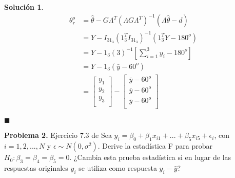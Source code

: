 \documentclass[12pt]{article}
\theoremstyle{plain}
\theoremstyle{definition}
\theoremstyle{definition}
\theoremstyle{definition}
\newtheorem*{solution}{Solución}
\begin{document}
\begin{solution}
\begin{align*}
\theta^{o}_{r} &= \hat{\theta}-G\Lambda^T(\Lambda G \Lambda^T)^{-1}(\Lambda \hat{\theta} - d)\\
&= Y - I_31_3(1^{T}_{3}I_31_3)^{-1}(1^{T}_{3}Y-180^o)\\
&= Y-1_3(3)^{-1}\left[\sum^{3}_{i=1}y_i - 180^o\right]\\
&= Y-1_3(\bar{y} - 60^o)\\
&=\begin{bmatrix}
     y_1 \\
    y_2 \\
   y_3 \\
\end{bmatrix} - \begin{bmatrix}
     \bar{y} - 60^o\\
  \bar{y} - 60^o \\
   \bar{y} - 60^o \\
\end{bmatrix}
\end{align*}
\end{solution}
\begin{flushright}
$\blacksquare$
\end{flushright}
\newpage
\noindent \textbf{Problema 2.} Ejercicio 7.3 de \cite{ravishanker2001first}
Sea $y_i=\beta_0+\beta_1 x_{i1} + ... + \beta_5 x_{i5} + \epsilon_i$, con $i = 1, 2, ..., N$ y $\epsilon \sim N(0,\sigma^2)$. Derive la estadística F para probar $H_0:\beta_3 = \beta_4 = \beta_5 = 0 $. ¿Cambia esta prueba estadística si en lugar de las respuestas originales $y_i$ se utiliza como respuesta $y_i-\bar{y}$?
\end{document}
